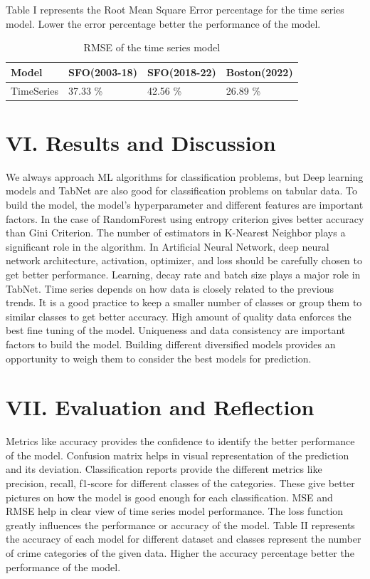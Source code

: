 \documentclass[conference,final, 10pt]{IEEEtran}
\begin{document}
Table I represents the Root Mean Square Error percentage for the time
series model. Lower the error percentage better the performance of the
model.

\begin{table}
\centering
\caption{\label{tab:unnamed-chunk-16}RMSE of the time series model}
\centering
\begin{tabular}[t]{l|l|l|l}
\hline
Model & SFO(2003-18) & SFO(2018-22) & Boston(2022)\\
\hline
TimeSeries & 37.33 \% & 42.56 \% & 26.89 \%\\
\hline
\end{tabular}
\end{table}

\section{VI. Results and Discussion}\label{vi.-results-and-discussion}

We always approach ML algorithms for classification problems, but Deep
learning models and TabNet are also good for classification problems on
tabular data. To build the model, the model's hyperparameter and
different features are important factors. In the case of RandomForest
using entropy criterion gives better accuracy than Gini Criterion. The
number of estimators in K-Nearest Neighbor plays a significant role in
the algorithm. In Artificial Neural Network, deep neural network
architecture, activation, optimizer, and loss should be carefully chosen
to get better performance. Learning, decay rate and batch size plays a
major role in TabNet. Time series depends on how data is closely related
to the previous trends. It is a good practice to keep a smaller number
of classes or group them to similar classes to get better accuracy. High
amount of quality data enforces the best fine tuning of the model.
Uniqueness and data consistency are important factors to build the
model. Building different diversified models provides an opportunity to
weigh them to consider the best models for prediction.

\section{VII. Evaluation and
Reflection}\label{vii.-evaluation-and-reflection}

Metrics like accuracy provides the confidence to identify the better
performance of the model. Confusion matrix helps in visual
representation of the prediction and its deviation. Classification
reports provide the different metrics like precision, recall, f1-score
for different classes of the categories. These give better pictures on
how the model is good enough for each classification. MSE and RMSE help
in clear view of time series model performance. The loss function
greatly influences the performance or accuracy of the model. Table II
represents the accuracy of each model for different dataset and classes
represent the number of crime categories of the given data. Higher the
accuracy percentage better the performance of the model.
\end{document}
